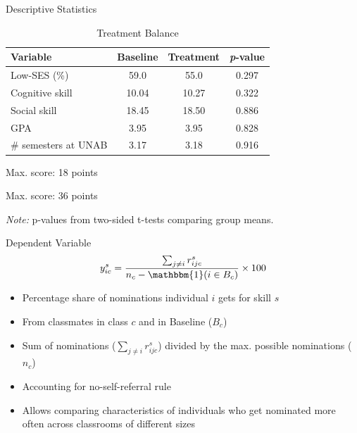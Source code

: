 \documentclass[aspectratio=169,xcolor=dvipsnames]{beamer}
\begin{document}
\begin{frame}{Descriptive Statistics}
    \begin{table}[htbp]
        \centering
        \begin{threeparttable}
            \caption{Treatment Balance}
            \begin{tabular}{lccc}
                \toprule
                Variable & Baseline & Treatment & \textit{p}-value \\
                \midrule
                Low-SES (\%) & 59.0 & 55.0 & 0.297 \\
                Cognitive skill\tnote{a} & 10.04 & 10.27 & 0.322 \\
                Social skill\tnote{b} & 18.45 & 18.50 & 0.886 \\
                GPA & 3.95 & 3.95 & 0.828 \\
                \# semesters at UNAB & 3.17 & 3.18 & 0.916 \\
                \bottomrule
            \end{tabular}
            \begin{tablenotes}
                \small
                \item[a] Max. score: 18 points
                \item[b] Max. score: 36 points
                \item[] \textit{Note:} p-values from two-sided t-tests comparing group means.
            \end{tablenotes}
            \label{tab:descriptive_stats}
        \end{threeparttable}
    \end{table}
\end{frame}

\begin{frame}{Dependent Variable}
    \begin{align*}
        y_{ic}^s = \frac{\sum_{j \neq i} r_{ijc}^s}{n_c - \mathbbm{1}(i \in B_c)} \times 100
    \end{align*}
    \begin{itemize}
        \item Percentage share of nominations individual $i$ gets for skill $s$
        \item From classmates in class $c$ and in Baseline ($B_c$)
        \item Sum of nominations ($\sum_{j \neq i} r_{ijc}^s$) divided by the max. possible nominations ($n_c$)
        \item Accounting for no-self-referral rule
        \item Allows comparing characteristics of individuals who get nominated more often across classrooms of different sizes
\end{itemize}        
\end{frame}
\end{document}
